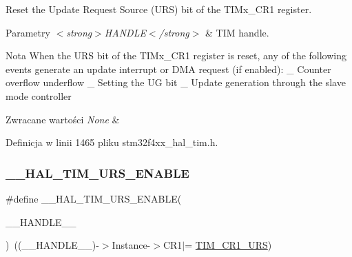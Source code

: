 Reset the Update Request Source (U\+RS) bit of the T\+I\+Mx\+\_\+\+C\+R1 register. 


\begin{DoxyParams}{Parametry}
{\em $<$strong$>$\+H\+A\+N\+D\+L\+E$<$/strong$>$} & T\+IM handle. \\
\hline
\end{DoxyParams}
\begin{DoxyNote}{Nota}
When the U\+RS bit of the T\+I\+Mx\+\_\+\+C\+R1 register is reset, any of the following events generate an update interrupt or D\+MA request (if enabled)\+: \+\_\+ Counter overflow underflow \+\_\+ Setting the UG bit \+\_\+ Update generation through the slave mode controller 
\end{DoxyNote}

\begin{DoxyRetVals}{Zwracane wartości}
{\em None} & \\
\hline
\end{DoxyRetVals}


Definicja w linii 1465 pliku stm32f4xx\+\_\+hal\+\_\+tim.\+h.

\mbox{\label{group___t_i_m___exported___macros_ga3b06856bd6d7e10cfff342b1726db51d}} 
\subsubsection{\texorpdfstring{\+\_\+\+\_\+\+H\+A\+L\+\_\+\+T\+I\+M\+\_\+\+U\+R\+S\+\_\+\+E\+N\+A\+B\+LE}{\_\_HAL\_TIM\_URS\_ENABLE}}
{\footnotesize\ttfamily \#define \+\_\+\+\_\+\+H\+A\+L\+\_\+\+T\+I\+M\+\_\+\+U\+R\+S\+\_\+\+E\+N\+A\+B\+LE(\begin{DoxyParamCaption}\item[{}]{\+\_\+\+\_\+\+H\+A\+N\+D\+L\+E\+\_\+\+\_\+ }\end{DoxyParamCaption})~((\+\_\+\+\_\+\+H\+A\+N\+D\+L\+E\+\_\+\+\_\+)-\/$>$Instance-\/$>$C\+R1$\vert$= \hyperlink{group___peripheral___registers___bits___definition_ga06c997c2c23e8bef7ca07579762c113b}{T\+I\+M\+\_\+\+C\+R1\+\_\+\+U\+RS})}



